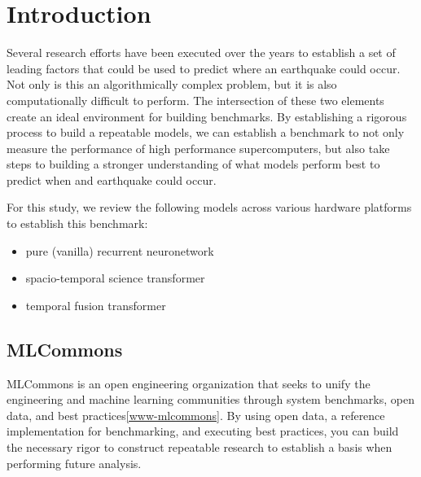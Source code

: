 \documentclass[sigplan,screen]{format/acmart}
\begin{document}


\maketitle

\section{Introduction}

Several research efforts have been executed over the years to establish a set of leading factors that could be used to predict where an earthquake could occur.
Not only is this an algorithmically complex problem, but it is also computationally difficult to perform\cite{fox2022aiforscience}.
The intersection of these two elements create an ideal environment for building benchmarks.
By establishing a rigorous process to build a repeatable models, we can establish a benchmark to not only measure the performance of high performance supercomputers, but also take steps to building a stronger understanding of what models perform best to predict when and earthquake could occur.

For this study, we review the following models across various hardware platforms to establish this benchmark:
\begin{itemize}
    \item pure (vanilla) recurrent neuronetwork
    \item spacio-temporal science transformer
    \item temporal fusion transformer
\end{itemize}

\subsection{MLCommons}

MLCommons is an open engineering organization that seeks to unify the engineering and machine learning communities through system benchmarks, open data, and best practices\ref{www-mlcommons}.
By using open data, a reference implementation for benchmarking, and executing best practices, you can build the necessary rigor to construct repeatable research to establish a basis when performing future analysis.
\end{document}
